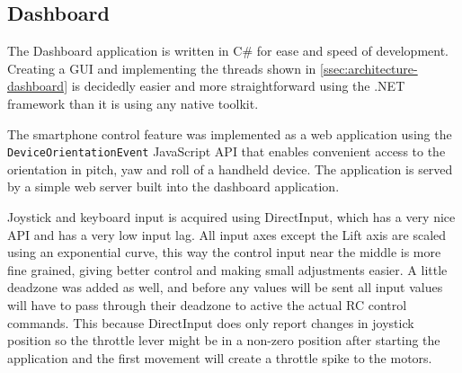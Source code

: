\documentclass[final]{article}
\begin{document}
\subsection{Dashboard}
The Dashboard application is written in C\# for ease and speed of development.
Creating a GUI and implementing the threads shown in \cref{ssec:architecture-dashboard} is decidedly easier and more straightforward using the .NET framework than it is using any native toolkit.

The smartphone control feature was implemented as a web application using the \texttt{DeviceOrientationEvent} JavaScript API that enables convenient access to the orientation in pitch, yaw and roll of a handheld device.
The application is served by a simple web server built into the dashboard application.

Joystick and keyboard input is acquired using DirectInput, which has a very nice API and has a very low input lag.
All input axes except the Lift axis are scaled using an exponential curve, this way the control input near the middle is more fine grained, giving better control and making small adjustments easier.
A little deadzone was added as well, and before any values will be sent all input values will have to pass through their deadzone to active the actual RC control commands.
This because DirectInput does only report changes in joystick position so the throttle lever might be in a non-zero position after starting the application and the first movement will create a throttle spike to the motors.
\end{document}
